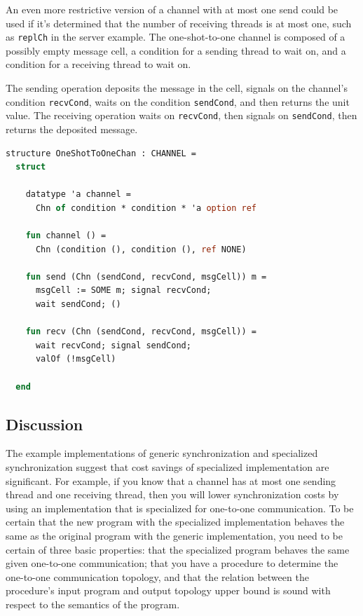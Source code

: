 \documentclass[10pt]{article}
\begin{document}
An even more restrictive version of a channel with at most one send could be used if it's
determined that the number of receiving threads is at most one,
such as \lstinline{replCh} in the server example.
The one-shot-to-one channel is
composed of a possibly empty message cell, a condition for a sending thread to wait on,
and a condition for a receiving thread to wait on.

The sending operation deposits the message in the cell, signals on the channel's condition \lstinline{recvCond},
waits on the condition \lstinline{sendCond}, and then returns the unit value.
The receiving operation waits on \lstinline{recvCond},
then signals on \lstinline{sendCond}, then returns the deposited message.

\begin{lstlisting}[language=ML, mathescape]
  structure OneShotToOneChan : CHANNEL =
  struct

    datatype 'a channel =
      Chn of condition * condition * 'a option ref

    fun channel () =
      Chn (condition (), condition (), ref NONE)

    fun send (Chn (sendCond, recvCond, msgCell)) m =
      msgCell := SOME m; signal recvCond;  
      wait sendCond; ()

    fun recv (Chn (sendCond, recvCond, msgCell)) =
      wait recvCond; signal sendCond;
      valOf (!msgCell)

  end
\end{lstlisting}

\subsection{Discussion}
The example implementations of generic synchronization and specialized synchronization suggest
that cost savings of specialized implementation are significant. For example, if you know that
a channel has at most one sending thread and one receiving thread, then you will
lower synchronization costs by
using an implementation that is specialized for one-to-one communication.  To be certain that
the new program with the specialized implementation behaves the same as the original program
with the generic implementation, you need to be certain of three basic properties: that the
specialized program behaves the same given one-to-one communication; that you have a procedure
to determine the one-to-one communication topology, and that the relation between the
procedure's input program and output topology upper bound is sound with respect to the
semantics of the program.  
\end{document}
